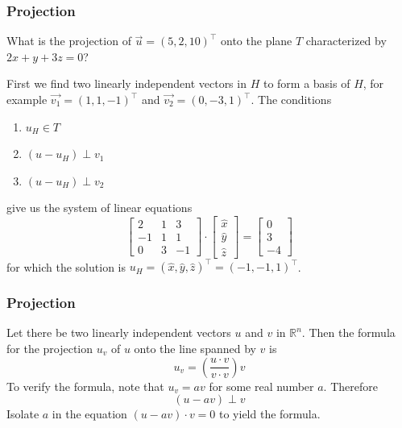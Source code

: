 \documentclass[xcolor=dvipsnames]{beamer}
\begin{document}
\begin{frame}
  \frametitle{Projection}
   What is the projection of
  $\vec{u}=(5,2,10)^{\intercal}$ onto the plane $T$ characterized by
  $2x+y+3z=0$?

  \medskip

  First we find two linearly independent vectors in $H$ to form a
  basis of $H$, for example $\vec{v_{1}}=(1,1,-1)^{\intercal}$ and
  $\vec{v_{2}}=(0,-3,1)^{\intercal}$. The conditions
  \begin{enumerate}
  \item $u_{H}\in{}T$
  \item $(u-u_{H})\perp{}v_{1}$
  \item $(u-u_{H})\perp{}v_{2}$
  \end{enumerate}
  give us the system of linear equations
  \begin{equation}
    \label{eq:faishiso}
    \left[
      \begin{array}{ccc}
        2 & 1 & 3 \\
        -1 & 1 & 1 \\
        0 & 3 & -1
      \end{array}\right]\cdot\left[
      \begin{array}{c}
        \hat{x} \\
        \hat{y} \\
        \hat{z}
      \end{array}\right]=\left[
      \begin{array}{c}
        0 \\
        3 \\
        -4
      \end{array}\right]
  \end{equation}
for which the solution is $u_{H}=(\hat{x},\hat{y},\hat{z})^{\intercal}=(-1,-1,1)^{\intercal}$.
\end{frame}

\begin{frame}
  \frametitle{Projection}
  Let there be two linearly independent vectors $u$ and $v$ in
  $\mathbb{R}^{n}$. Then the formula for the projection $u_{v}$ of $u$ onto
  the line spanned by $v$ is
  \begin{equation}
    \label{eq:weehohqu}
    u_{v}=\left(\frac{u\cdot{}v}{v\cdot{}v}\right)v
  \end{equation}
To verify the formula, note that $u_{v}=av$ for some real number $a$.
Therefore
\begin{equation}
  \label{eq:yahveego}
  (u-av)\perp{}v
\end{equation}
Isolate $a$ in the equation $(u-av)\cdot{}v=0$ to yield the formula.
\end{frame}
\end{document}
